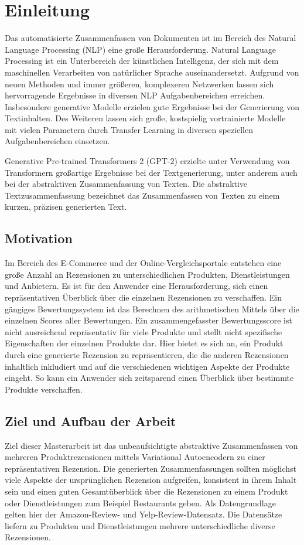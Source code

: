 \section{Einleitung}\raggedbottom
Das automatisierte Zusammenfassen von Dokumenten ist im Bereich des Natural Language Processing (NLP) eine große Herausforderung.
Natural Language Processing ist ein Unterbereich der künstlichen Intelligenz, der sich mit dem maschinellen Verarbeiten von natürlicher Sprache auseinandersetzt. 
Aufgrund von neuen Methoden und immer größeren, komplexeren Netzwerken lassen sich hervorragende Ergebnisse in diversen NLP Aufgabenbereichen erreichen. %
Insbesondere generative Modelle erzielen gute Ergebnisse bei der Generierung von Textinhalten. 
Des Weiteren lassen sich große, kostspielig vortrainierte Modelle mit vielen Parametern durch Transfer Learning in diversen speziellen Aufgabenbereichen einsetzen. 

Generative Pre-trained Transformers 2 (GPT-2) erzielte unter Verwendung von Transformern großartige Ergebnisse bei der Textgenerierung, unter anderem auch bei der abstraktiven Zusammenfassung von Texten. 
Die abstraktive Textzusammenfassung bezeichnet das Zusammenfassen von Texten zu einem kurzen, präzisen generierten Text.

\subsection{Motivation}
Im Bereich des E-Commerce und der Online-Vergleichsportale entstehen eine große Anzahl an Rezensionen zu unterschiedlichen Produkten, Dienstleistungen und Anbietern.
Es ist für den Anwender eine Herausforderung, sich einen repräsentativen Überblick über die einzelnen Rezensionen zu verschaffen. 
Ein gängiges Bewertungssystem ist das Berechnen des arithmetischen Mittels über die einzelnen Scores aller Bewertungen. 
Ein zusammengefasster Bewertungsscore ist nicht ausreichend repräsentativ für viele Produkte und stellt nicht spezifische Eigenschaften der einzelnen Produkte dar.
Hier bietet es sich an, ein Produkt durch eine generierte Rezension zu repräsentieren, die die anderen Rezensionen inhaltlich inkludiert und auf die verschiedenen wichtigen Aspekte der Produkte eingeht.
So kann ein Anwender sich zeitsparend einen Überblick über bestimmte Produkte verschaffen.

\subsection{Ziel und Aufbau der Arbeit}
Ziel dieser Masterarbeit ist das unbeaufsichtigte abstraktive Zusammenfassen von mehreren Produktrezensionen mittels Variational Autoencodern zu einer repräsentativen Rezension.
Die generierten Zusammenfassungen sollten möglichst viele Aspekte der ursprünglichen Rezension aufgreifen, konsistent in ihrem Inhalt sein und einen guten Gesamtüberblick über die Rezensionen zu einem Produkt oder Dienstleistungen zum Beispiel Restaurants geben.
Als Datengrundlage gelten hier der Amazon-Review- und Yelp-Review-Datensatz.
Die Datensätze liefern zu Produkten und Dienstleistungen mehrere unterschiedliche diverse Rezensionen.

